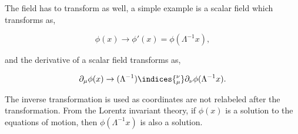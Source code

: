 The field has to transform as well, a simple example is a scalar field which transforms as,
\begin{Note}
\begin{equation}
  \phi(x) \rightarrow \phi'(x) = \phi(\Lambda^{-1}x),
\end{equation}
\end{Note}
and the derivative of a scalar field transforms as, 
\begin{Note}
\begin{equation}
  \partial_\mu \phi(x) \rightarrow (\Lambda^{-1})\indices{^\nu_\mu}\partial_\nu \phi(\Lambda^{-1}x).
\end{equation}
\end{Note}
The inverse transformation is used as coordinates are not relabeled after the transformation. From the \textsf{Lorentz invariant theory}, if $\phi(x)$ is a solution to the equations of motion, then $\phi(\Lambda^{-1}x)$ is also a solution. 
